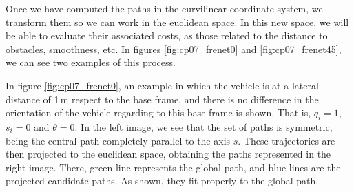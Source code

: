 Once we have computed the paths in the curvilinear coordinate system, we transform them so we can work in the euclidean space. In this new space, we will be able to evaluate their associated costs, as those related to the distance to obstacles, smoothness, etc. In figures \ref{fig:cp07_frenet0} and \ref{fig:cp07_frenet45}, we can see two examples of this process.

In figure \ref{fig:cp07_frenet0}, an example in which the vehicle is at a lateral distance of 1\,m respect to the base frame, and there is no difference in the orientation of the vehicle regarding to this base frame is shown. That is, $q_i = 1$, $s_i = 0$ and $\theta = 0$. In the left image, we see that the set of paths is symmetric, being the central path completely parallel to the axis $s$. These trajectories are then projected to the euclidean space, obtaining the paths represented in the right image. There, green line represents the global path, and blue lines are the projected candidate paths. As shown, they fit properly to the global path.

